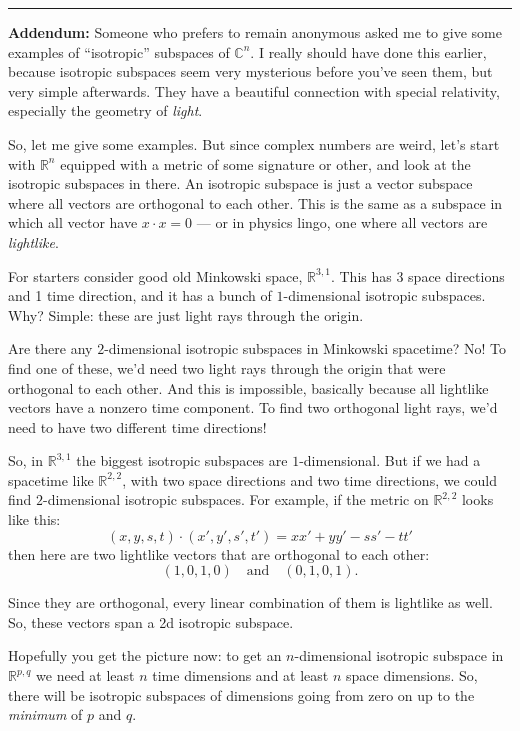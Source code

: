 \documentclass{article}
\begin{document}
\begin{center}\rule{0.5\linewidth}{0.5pt}\end{center}

\textbf{Addendum:} Someone who prefers to remain anonymous asked me to
give some examples of ``isotropic'' subspaces of \(\mathbb{C}^n\). I
really should have done this earlier, because isotropic subspaces seem
very mysterious before you've seen them, but very simple afterwards.
They have a beautiful connection with special relativity, especially the
geometry of \emph{light}.

So, let me give some examples. But since complex numbers are weird,
let's start with \(\mathbb{R}^n\) equipped with a metric of some
signature or other, and look at the isotropic subspaces in there. An
isotropic subspace is just a vector subspace where all vectors are
orthogonal to each other. This is the same as a subspace in which all
vector have \(x\cdot x=0\) --- or in physics lingo, one where all
vectors are \emph{lightlike}.

For starters consider good old Minkowski space, \(\mathbb{R}^{3,1}\).
This has 3 space directions and 1 time direction, and it has a bunch of
\(1\)-dimensional isotropic subspaces. Why? Simple: these are just light
rays through the origin.

Are there any \(2\)-dimensional isotropic subspaces in Minkowski
spacetime? No! To find one of these, we'd need two light rays through
the origin that were orthogonal to each other. And this is impossible,
basically because all lightlike vectors have a nonzero time component.
To find two orthogonal light rays, we'd need to have two different time
directions!

So, in \(\mathbb{R}^{3,1}\) the biggest isotropic subspaces are
\(1\)-dimensional. But if we had a spacetime like \(\mathbb{R}^{2,2}\),
with two space directions and two time directions, we could find
\(2\)-dimensional isotropic subspaces. For example, if the metric on
\(\mathbb{R}^{2,2}\) looks like this:
\[(x,y,s,t)\cdot(x',y',s',t') = xx' + yy' - ss' - tt'\] then here are
two lightlike vectors that are orthogonal to each other:
\[(1,0,1,0) \quad\text{and}\quad (0,1,0,1).\]

Since they are orthogonal, every linear combination of them is lightlike
as well. So, these vectors span a 2d isotropic subspace.

Hopefully you get the picture now: to get an \(n\)-dimensional isotropic
subspace in \(\mathbb{R}^{p,q}\) we need at least \(n\) time dimensions
and at least \(n\) space dimensions. So, there will be isotropic
subspaces of dimensions going from zero on up to the \emph{minimum} of
\(p\) and \(q\).
\end{document}
